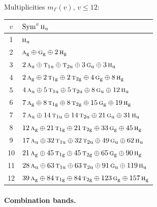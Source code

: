 \documentclass[11pt]{article}
\newcommand{\irr}[1]{\text{\normalfont\scshape #1}}
\newcommand{\ptag}[1]{\mathrm{#1}}
\begin{document}
Multiplicities $m_\Gamma(v)$, $v\le12$:
\begin{longtable}{c l}\hline $v$ & $\operatorname{Sym}^{v}\irr{h}_{\ptag{u}}$\\ \hline\endhead
1 & $\irr{h}_{\ptag{u}}$\\
2 & $\irr{a}_{\ptag{g}}\oplus \irr{g}_{\ptag{g}}\oplus 2\,\irr{h}_{\ptag{g}}$\\
3 & $2\,\irr{a}_{\ptag{u}}\oplus \irr{t}_{1\ptag{u}}\oplus \irr{t}_{2\ptag{u}}\oplus 3\,\irr{g}_{\ptag{u}}\oplus 3\,\irr{h}_{\ptag{u}}$\\
4 & $2\,\irr{a}_{\ptag{g}}\oplus 2\,\irr{t}_{1\ptag{g}}\oplus 2\,\irr{t}_{2\ptag{g}}\oplus 4\,\irr{g}_{\ptag{g}}\oplus 8\,\irr{h}_{\ptag{g}}$\\
5 & $4\,\irr{a}_{\ptag{u}}\oplus 5\,\irr{t}_{1\ptag{u}}\oplus 5\,\irr{t}_{2\ptag{u}}\oplus 8\,\irr{g}_{\ptag{u}}\oplus 12\,\irr{h}_{\ptag{u}}$\\
6 & $7\,\irr{a}_{\ptag{g}}\oplus 8\,\irr{t}_{1\ptag{g}}\oplus 8\,\irr{t}_{2\ptag{g}}\oplus 15\,\irr{g}_{\ptag{g}}\oplus 19\,\irr{h}_{\ptag{g}}$\\
7 & $7\,\irr{a}_{\ptag{u}}\oplus 14\,\irr{t}_{1\ptag{u}}\oplus 14\,\irr{t}_{2\ptag{u}}\oplus 21\,\irr{g}_{\ptag{u}}\oplus 31\,\irr{h}_{\ptag{u}}$\\
8 & $12\,\irr{a}_{\ptag{g}}\oplus 21\,\irr{t}_{1\ptag{g}}\oplus 21\,\irr{t}_{2\ptag{g}}\oplus 33\,\irr{g}_{\ptag{g}}\oplus 45\,\irr{h}_{\ptag{g}}$\\
9 & $17\,\irr{a}_{\ptag{u}}\oplus 32\,\irr{t}_{1\ptag{u}}\oplus 32\,\irr{t}_{2\ptag{u}}\oplus 49\,\irr{g}_{\ptag{u}}\oplus 62\,\irr{h}_{\ptag{u}}$\\
10 & $21\,\irr{a}_{\ptag{g}}\oplus 45\,\irr{t}_{1\ptag{g}}\oplus 45\,\irr{t}_{2\ptag{g}}\oplus 65\,\irr{g}_{\ptag{g}}\oplus 90\,\irr{h}_{\ptag{g}}$\\
11 & $28\,\irr{a}_{\ptag{u}}\oplus 63\,\irr{t}_{1\ptag{u}}\oplus 63\,\irr{t}_{2\ptag{u}}\oplus 91\,\irr{g}_{\ptag{u}}\oplus 119\,\irr{h}_{\ptag{u}}$\\
12 & $39\,\irr{a}_{\ptag{g}}\oplus 84\,\irr{t}_{1\ptag{g}}\oplus 84\,\irr{t}_{2\ptag{g}}\oplus 123\,\irr{g}_{\ptag{g}}\oplus 157\,\irr{h}_{\ptag{g}}$\\
\hline\end{longtable}

\paragraph{Combination bands.}
\end{document}
